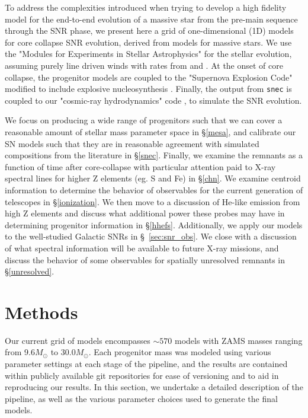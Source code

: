 \documentclass[twocolumn]{aastex631}
\begin{document}
To address the complexities introduced when trying to develop a high fidelity model for the end-to-end evolution of a massive star from the pre-main sequence through the SNR phase, we present here a grid of one-dimensional (1D) models for core collapse SNR evolution, derived from models for massive stars. We use the "Modules for Experiments in Stellar Astrophysics" \citep[\texttt{mesa};][]{paxton1,paxton2,paxton3,paxton4,paxton5} for the stellar evolution, assuming purely line driven winds with rates from \citet{vl05} and \citet{dj88}. At the onset of core collapse, the progenitor models are coupled to the "Supernova Explosion Code" \citep[\texttt{snec};][]{moro1} modified to include explosive nucleosynthesis \citep{pat17}. Finally, the output from \texttt{snec} is coupled to our "cosmic-ray hydrodynamics" code
\citep[\texttt{ChN};][]{ellison07,ChN1,ChN2,ChN3}, to simulate the SNR evolution.

We focus on producing a wide range of progenitors such that we can cover a reasonable amount of stellar mass parameter space in \S \ref{mesa}, and calibrate our SN models such that they are in reasonable agreement with simulated compositions from the literature in \S \ref{snec}. Finally, we examine the remnants as a function of time after core-collapse with particular attention paid to X-ray spectral lines for higher Z elements (eg. S and Fe) in \S \ref{chn}.  We examine centroid information to determine the behavior of observables for the current generation of telescopes in \S \ref{ionization}. We then move to a discussion of He-like emission from high Z elements and discuss what additional power these probes may have in determining progenitor information in \S \ref{hhefs}. Additionally, we apply our models to the well-studied Galactic SNRs in \S~\ref{sec:snr_obs}. We close with a discussion of what spectral information will be available to future X-ray missions, and discuss the behavior of some observables for spatially unresolved remnants in \S \ref{unresolved}.

\section{Methods}
\label{methods}
Our current grid of models encompasses $\sim 570$ models with ZAMS masses ranging from 9.6$M_{\odot}$ to 30.0$M_{\odot}$. Each progenitor mass was modeled using various parameter settings at each stage of the pipeline, and the results are contained within publicly available git repositories for ease of versioning and to aid in reproducing our results.  In this section, we undertake a detailed description of the pipeline, as well as the various parameter choices used to generate the final models.
\end{document}
